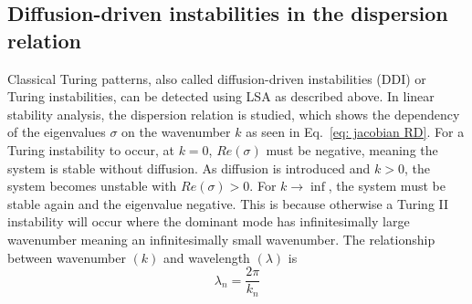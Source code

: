 




\subsection{Diffusion-driven instabilities in the dispersion relation}
Classical Turing patterns, also called diffusion-driven instabilities (DDI) or Turing instabilities, can be detected using LSA as described above.
In linear stability analysis, the dispersion relation is studied, which shows the dependency of the eigenvalues $\sigma$ on the wavenumber $k$ as seen in Eq.~\ref{eq: jacobian RD}.
For a Turing instability to occur, at $k=0$, $Re(\sigma)$ must be negative, meaning the system is stable without diffusion.
As diffusion is introduced and $k>0$, the system becomes unstable with $Re(\sigma)>0$.
For $k \rightarrow \inf$, the system must be stable again and the eigenvalue negative.
This is because otherwise a Turing II instability will occur where the dominant mode has infinitesimally large wavenumber meaning an infinitesimally small wavenumber.
The relationship between wavenumber $(k)$ and wavelength $(\lambda)$ is
\begin{equation}
    \lambda_n = \frac{2 \pi}{k_n}
    \label{eq:wavelength_wavenumber}
\end{equation}
